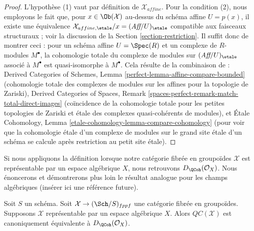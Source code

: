 \begin{proof}
L'hypothèse (1) vaut par définition de $\mathcal{X}_{affine}$.
Pour la condition (2), nous employons le fait que, pour $x \in \Ob(\mathcal{X})$
au-dessus du schéma affine $U = p(x)$, il existe une équivalence
$\mathcal{X}_{affine, \etale}/x = (\textit{Aff}/U)_\etale$ compatible
aux faisceaux structuraux ; voir la
discussion de la Section \ref{section-restriction}.
Il suffit donc de montrer ceci : pour un schéma affine $U = \Spec(R)$
et un complexe de $R$-modules $M^\bullet$, la cohomologie totale
du complexe de modules sur $(\textit{Aff}/U)_\etale$
associé à $M^\bullet$ est quasi-isomorphe à $M^\bullet$.
Cela résulte de la combinaison de :
Derived Categories of Schemes, Lemma
\ref{perfect-lemma-affine-compare-bounded} (cohomologie totale des complexes
de modules sur les affines pour la topologie de Zariski),
Derived Categories of Spaces, Remark
\ref{spaces-perfect-remark-match-total-direct-images}
(coïncidence de la cohomologie totale pour les petites
topologies de Zariski et étale des
complexes quasi-cohérents de modules), et
Étale Cohomology, Lemma \ref{etale-cohomology-lemma-compare-cohomology}
(pour voir que la cohomologie étale d'un complexe de modules
sur le grand site étale d'un schéma
se calcule après restriction au petit site étale).
\end{proof}

\noindent
Si nous appliquons la définition lorsque notre catégorie fibrée en groupoïdes
$\mathcal{X}$ est représentable par un espace algébrique $X$, nous
retrouvons $D_\QCoh(\mathcal{O}_X)$. Nous énoncerons et démontrerons plus loin le
résultat analogue pour les champs algébriques (insérer ici une référence future).

\begin{proposition}
\label{proposition-QC-compare}
Soit $S$ un schéma. Soit $\mathcal{X} \to (\Sch/S)_{fppf}$ une catégorie
fibrée en groupoïdes. Supposons $\mathcal{X}$ représentable par un espace
algébrique $X$. Alors $\mathit{QC}(\mathcal{X})$ est canoniquement équivalente à
$D_\QCoh(\mathcal{O}_X)$.
\end{proposition}


